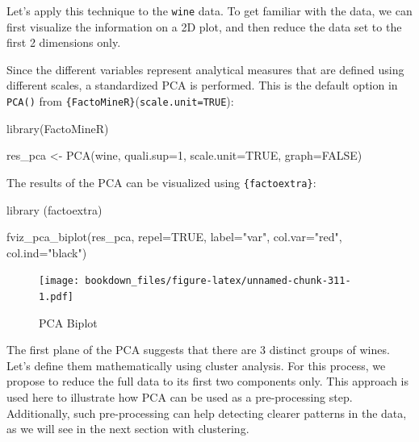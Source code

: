 \documentclass[
]{krantz}
\makeatletter
\newenvironment{Shaded}{\begin{snugshade}}{\end{snugshade}}
\newcommand{\AttributeTok}[1]{\textcolor[rgb]{0.61,0.61,0.61}{#1}}
\newcommand{\ConstantTok}[1]{\textcolor[rgb]{0,0,0}{#1}}
\newcommand{\DecValTok}[1]{\textcolor[rgb]{0.06,0.06,0.06}{#1}}
\newcommand{\FunctionTok}[1]{\textcolor[rgb]{0,0,0}{#1}}
\newcommand{\NormalTok}[1]{#1}
\newcommand{\OtherTok}[1]{\textcolor[rgb]{0.37,0.37,0.37}{#1}}
\newcommand{\StringTok}[1]{\textcolor[rgb]{0.5,0.5,0.5}{#1}}
\newenvironment{kframe}{%
\medskip{}
\setlength{\fboxsep}{.8em}
 \def\at@end@of@kframe{}%
 \ifinner\ifhmode%
  \def\at@end@of@kframe{\end{minipage}}%
  \begin{minipage}{\columnwidth}%
 \fi\fi%
 \def\FrameCommand##1{\hskip\@totalleftmargin \hskip-\fboxsep
 \colorbox{shadecolor}{##1}\hskip-\fboxsep
     \hskip-\linewidth \hskip-\@totalleftmargin \hskip\columnwidth}%
 \MakeFramed {\advance\hsize-\width
   \@totalleftmargin\z@ \linewidth\hsize
   \@setminipage}}%
 {\par\unskip\endMakeFramed%
 \at@end@of@kframe}
\renewenvironment{Shaded}{\begin{kframe}}{\end{kframe}}
\makeatother
\begin{document}
Let's apply this technique to the \texttt{wine} data. To get familiar with the data, we can first visualize the information on a 2D plot, and then reduce the data set to the first 2 dimensions only.

Since the different variables represent analytical measures that are defined using different scales, a standardized PCA is performed. This is the default option in \texttt{PCA()} from \texttt{\{FactoMineR\}}(\texttt{scale.unit=TRUE}):

\begin{Shaded}
\begin{Highlighting}[]
\FunctionTok{library}\NormalTok{(FactoMineR)}

\NormalTok{res\_pca }\OtherTok{\textless{}{-}} \FunctionTok{PCA}\NormalTok{(wine, }\AttributeTok{quali.sup=}\DecValTok{1}\NormalTok{, }\AttributeTok{scale.unit=}\ConstantTok{TRUE}\NormalTok{, }\AttributeTok{graph=}\ConstantTok{FALSE}\NormalTok{)}
\end{Highlighting}
\end{Shaded}

The results of the PCA can be visualized using \texttt{\{factoextra\}}:

\begin{Shaded}
\begin{Highlighting}[]
\FunctionTok{library}\NormalTok{ (factoextra)}

\FunctionTok{fviz\_pca\_biplot}\NormalTok{(res\_pca, }\AttributeTok{repel=}\ConstantTok{TRUE}\NormalTok{, }\AttributeTok{label=}\StringTok{"var"}\NormalTok{, }
                \AttributeTok{col.var=}\StringTok{"red"}\NormalTok{, }\AttributeTok{col.ind=}\StringTok{"black"}\NormalTok{)}
\end{Highlighting}
\end{Shaded}

\begin{figure}
\centering
\texttt{[image: bookdown\_files/figure-latex/unnamed-chunk-311-1.pdf]}
\caption{\label{fig:unnamed-chunk-311}PCA Biplot}
\end{figure}

The first plane of the PCA suggests that there are 3 distinct groups of wines. Let's define them mathematically using cluster analysis. For this process, we propose to reduce the full data to its first two components only. This approach is used here to illustrate how PCA can be used as a pre-processing step. Additionally, such pre-processing can help detecting clearer patterns in the data, as we will see in the next section with clustering.
\end{document}

